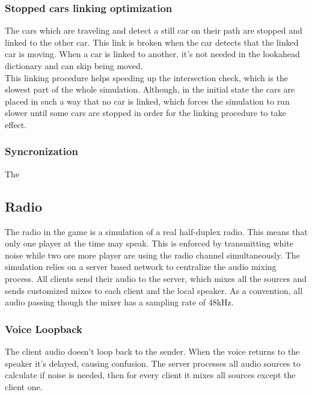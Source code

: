 \documentclass{article}
\begin{document}
\subsubsection{Stopped cars linking optimization}
The cars which are traveling and detect a still car on their path are stopped and linked to the other car. This link is broken when the car detects that the linked car is moving. When a car is linked to another, it's not needed in the lookahead dictionary and can skip being moved. \\
This linking procedure helps speeding up the intersection check, which is the slowest part of the whole simulation. Although, in the initial state the cars are placed in such a way that no car is linked, which forces the simulation to run slower until some cars are stopped in order for the linking procedure to take effect.

\subsubsection{Syncronization}
The 

\clearpage

\subsection{Radio}
The radio in the game is a simulation of a real half-duplex radio. This means that only one player at the time may speak. This is enforced by transmitting white noise while two ore more player are using the radio channel simultaneously. The simulation relies on a server based network to centralize the audio mixing process. All clients send their audio to the server, which mixes all the sources and sends customized mixes to each client and the local speaker. As a convention, all audio passing though the mixer has a sampling rate of 48kHz. 
\subsubsection{Voice Loopback}
The client audio doesn't loop back to the sender. When the voice returns to the speaker it's delayed, causing confusion. The server processes all audio sources to calculate if noise is needed, then for every client it mixes all sources except the client one.
\end{document}
